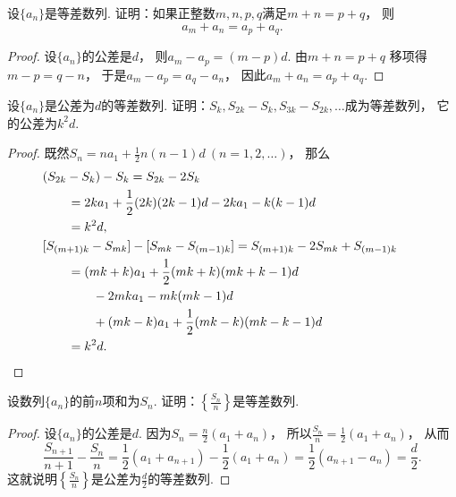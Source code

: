 \begin{example}
设\(\{a_n\}\)是等差数列.
证明：如果正整数\(m,n,p,q\)满足\(m+n=p+q\)，
则\[
	a_m+a_n=a_p+a_q.
\]
\begin{proof}
设\(\{a_n\}\)的公差是\(d\)，
则\(a_m-a_p = (m-p)d\).
由\(m+n=p+q\)
移项得\(m-p=q-n\)，
于是\(a_m-a_p = a_q-a_n\)，
因此\(a_m+a_n=a_p+a_q\).
\end{proof}
\end{example}

\begin{example}
设\(\{a_n\}\)是公差为\(d\)的等差数列.
证明：\(S_k,S_{2k}-S_k,S_{3k}-S_{2k},\dotsc\)成为等差数列，
它的公差为\(k^2 d\).
\begin{proof}
既然\(S_n = n a_1 + \frac12 n(n-1) d\ (n=1,2,\dotsc)\)，
那么\begin{align*}
	&\hspace{-20pt}
	(S_{2k}-S_k) - S_k
	= S_{2k} - 2 S_k \\
	&= 2k a_1 + \frac12 (2k)(2k-1) d
	- 2 k a_1 - k(k-1) d \\
	&= k^2 d, \\
	&\hspace{-20pt}
	[S_{(m+1)k}-S_{mk}] - [S_{mk}-S_{(m-1)k}]
	= S_{(m+1)k} - 2 S_{mk} + S_{(m-1)k} \\
	&= (mk+k) a_1 + \frac12 (mk+k)(mk+k-1) d \\
	&\hspace{20pt}
	- 2 mk a_1 - mk (mk-1) d \\
	&\hspace{20pt}
	+ (mk-k) a_1 + \frac12 (mk-k)(mk-k-1) d \\
	&= k^2 d.
	\qedhere
\end{align*}
\end{proof}
\end{example}

\begin{example}
设数列\(\{a_n\}\)的前\(n\)项和为\(S_n\).
证明：\(\left\{\frac{S_n}{n}\right\}\)是等差数列.
\begin{proof}
设\(\{a_n\}\)的公差是\(d\).
因为\(S_n=\frac{n}2(a_1+a_n)\)，
所以\(\frac{S_n}{n}=\frac12(a_1+a_n)\)，
从而\[
	\frac{S_{n+1}}{n+1}-\frac{S_n}{n}
	= \frac12(a_1+a_{n+1})-\frac12(a_1+a_n)
	= \frac12(a_{n+1}-a_n)
	= \frac{d}2.
\]
这就说明\(\left\{\frac{S_n}{n}\right\}\)是公差为\(\frac{d}2\)的等差数列.
\end{proof}
\end{example}

